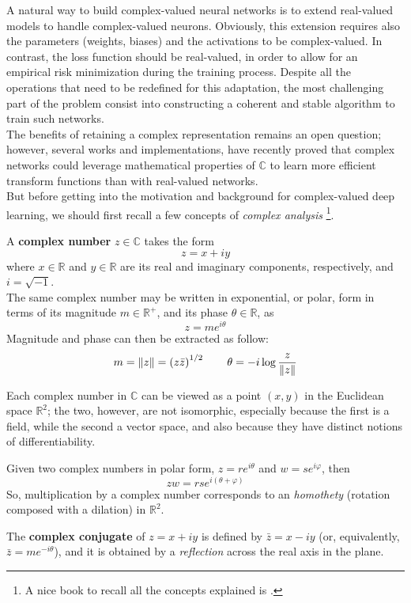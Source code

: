 \documentclass[../main.tex]{subfiles}
\begin{document}
A natural way to build complex-valued neural networks is to extend real-valued models to handle complex-valued neurons. Obviously, this extension requires also the parameters (weights, biases) and the activations to be complex-valued. In contrast, the loss function should be real-valued, in order to allow for an empirical risk minimization during the training process. Despite all the operations that need to be redefined for this adaptation, the most challenging part of the problem consist into constructing a coherent and stable algorithm to train such networks.\\
The benefits of retaining a complex representation remains an open question; however, several works and implementations, have recently proved that complex networks could leverage mathematical properties of $\mathds{C}$ to learn more efficient transform functions than with real-valued networks.\\
But before getting into the motivation and background for complex-valued deep learning, we should first recall a few concepts of \textit{complex analysis} \footnote{A nice book to recall all the concepts explained is \cite{stein_complex_analysis}.}. 
\begin{definition}
A \textbf{complex number} $z\in\mathds{C}$ takes the form 
\[ z = x+iy \] 
where $x\in\mathds{R}$ and $y\in\mathds{R}$ are its real and imaginary components, respectively, and $i = \sqrt{-1}$.\\
 The same complex number may be written in exponential, or polar, form in terms of its magnitude $m\in\mathds{R}^+$, and its phase $\theta\in\mathds{R}$, as 
\[ z = me^{i\theta} \]
Magnitude and phase can then be extracted as follow:
\[ m = \norm{z} = \left(z\bar{z}\right)^{1/2} \qquad \theta = -i\log\frac{z}{\norm{z}} \]
\end{definition}
Each complex number in $\mathds{C}$ can be viewed as a point $(x,y)$ in the Euclidean space $\mathds{R}^2$; the two, however, are not isomorphic, especially because the first is a field, while the second a vector space, and also because they have distinct notions of differentiability.
\begin{observation}
Given two complex numbers in polar form, $z=re^{i\theta}$ and $w=se^{i\varphi}$, then 
\[ zw = rse^{i(\theta+\varphi)} \]
So, multiplication by a complex number corresponds to an \textit{homothety} (rotation composed with a dilation) in $\mathds{R}^2$.
\label{obs:cmplx_mult_homothety} 
\end{observation}
\begin{definition}
The \textbf{complex conjugate} of $z = x+iy$ is defined by $\bar{z} = x-iy$ (or, equivalently, $\bar{z}=me^{-i\theta}$), and it is obtained by a \textit{reflection} across the real axis in the plane.
\end{definition}
\end{document}
